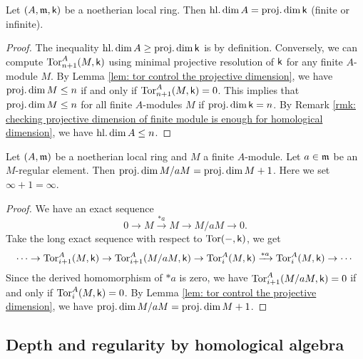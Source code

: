    \begin{proposition}\label{prop: homological dimension of local ring is projective dimension of residue field}
        Let \((A,{\mathfrak{m}},{\mathsf{k}})\) be a noetherian local ring.
        Then \(\operatorname{hl.dim} A = \operatorname{proj.dim} {\mathsf{k}}\) (finite or infinite).
    \end{proposition}
    \begin{proof}
        The inequality \(\operatorname{hl.dim} A \geq \operatorname{proj.dim} {\mathsf{k}}\) is by definition.
        Conversely, we can compute \(\operatorname{Tor}_{n+1}^A(M,{\mathsf{k}})\) using minimal projective resolution of \({\mathsf{k}}\) for any finite \(A\)-module \(M\).
        By Lemma \ref{lem: tor control the projective dimension}, we have \(\operatorname{proj.dim} M \leq n\) if and only if \(\operatorname{Tor}_{n+1}^A(M,{\mathsf{k}}) = 0\).
        This implies that \(\operatorname{proj.dim} M \leq n\) for all finite \(A\)-modules \(M\) if \(\operatorname{proj.dim} {\mathsf{k}} = n\).
        By Remark \ref{rmk: checking projective dimension of finite module is enough for homological dimension}, we have \(\operatorname{hl.dim} A \leq n\).
    \end{proof}

    \begin{proposition}\label{prop: induction on projective dimension}
        Let \((A,{\mathfrak{m}})\) be a noetherian local ring and \(M\) a finite \(A\)-module.
        Let \(a \in {\mathfrak{m}}\) be an \(M\)-regular element.
        Then \(\operatorname{proj.dim} M/aM = \operatorname{proj.dim} M + 1\).
        Here we set \(\infty + 1 = \infty\).
    \end{proposition}
    \begin{proof}
        We have an exact sequence
        \[ 0 \to M  \xrightarrow{*a} M \to M/aM \to 0. \]
        Take the long exact sequence with respect to \(\operatorname{Tor}(-,{\mathsf{k}})\), we get
        \[ \cdots \to \operatorname{Tor}_{i+1}^A(M,{\mathsf{k}}) \to \operatorname{Tor}_{i+1}^A(M/aM,{\mathsf{k}}) \to \operatorname{Tor}_i^A(M,{\mathsf{k}}) \xrightarrow{*a} \operatorname{Tor}_i^A(M,{\mathsf{k}}) \to \cdots \]
        Since the derived homomorphism of \(*a\) is zero, we have \(\operatorname{Tor}_{i+1}^A(M/aM,{\mathsf{k}}) = 0\) if and only if \(\operatorname{Tor}_{i}^A(M,{\mathsf{k}}) = 0\).
        By Lemma \ref{lem: tor control the projective dimension}, we have \(\operatorname{proj.dim} M/aM = \operatorname{proj.dim} M + 1\).
    \end{proof}

\subsection{Depth and regularity by homological algebra}

